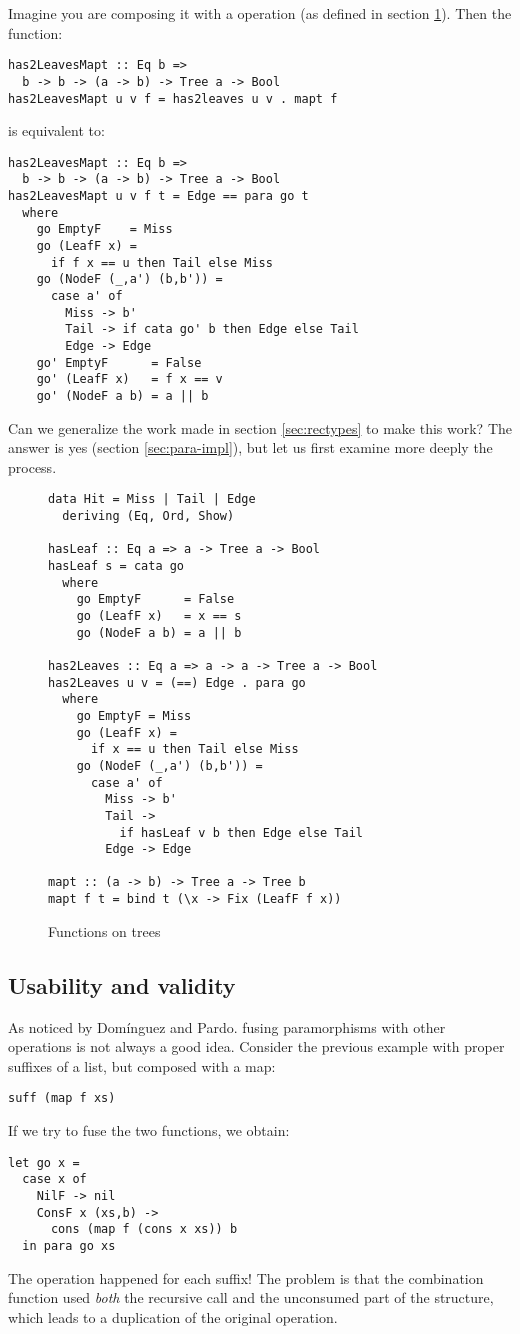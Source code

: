 Imagine you are composing it with a  operation (as defined in section \ref{fig:has2Leaves}). Then
the function:
\begin{verbatim}
has2LeavesMapt :: Eq b =>
  b -> b -> (a -> b) -> Tree a -> Bool
has2LeavesMapt u v f = has2leaves u v . mapt f
\end{verbatim}
\noindent is equivalent to:
\begin{verbatim}
has2LeavesMapt :: Eq b =>
  b -> b -> (a -> b) -> Tree a -> Bool
has2LeavesMapt u v f t = Edge == para go t
  where
    go EmptyF    = Miss
    go (LeafF x) =
      if f x == u then Tail else Miss
    go (NodeF (_,a') (b,b')) =
      case a' of
        Miss -> b'
        Tail -> if cata go' b then Edge else Tail
        Edge -> Edge
    go' EmptyF      = False
    go' (LeafF x)   = f x == v
    go' (NodeF a b) = a || b
\end{verbatim}

\noindent Can we generalize the work made in section \ref{sec:rectypes} to make this work? The answer is yes (section \ref{sec:para-impl}), but let us first examine more deeply the process.

\begin{figure}
\begin{verbatim}
data Hit = Miss | Tail | Edge
  deriving (Eq, Ord, Show)

hasLeaf :: Eq a => a -> Tree a -> Bool
hasLeaf s = cata go
  where
    go EmptyF      = False
    go (LeafF x)   = x == s
    go (NodeF a b) = a || b

has2Leaves :: Eq a => a -> a -> Tree a -> Bool
has2Leaves u v = (==) Edge . para go
  where
    go EmptyF = Miss
    go (LeafF x) =
      if x == u then Tail else Miss
    go (NodeF (_,a') (b,b')) =
      case a' of
        Miss -> b'
        Tail ->
          if hasLeaf v b then Edge else Tail
        Edge -> Edge

mapt :: (a -> b) -> Tree a -> Tree b
mapt f t = bind t (\x -> Fix (LeafF f x))
\end{verbatim}
\caption{Functions on trees}
\label{fig:has2Leaves}
\end{figure}

\subsection{Usability and validity}
As noticed by Domínguez and Pardo. \cite{paramorphismFusion} fusing paramorphisms with other operations is not always a good idea. Consider the previous example with proper suffixes of a list, but composed with a map:
\begin{verbatim}
suff (map f xs)
\end{verbatim}
\noindent If we try to fuse the two functions, we obtain:
\begin{verbatim}
let go x =
  case x of
    NilF -> nil
    ConsF x (xs,b) ->
      cons (map f (cons x xs)) b
  in para go xs
\end{verbatim}
\noindent The  operation happened for each suffix! The problem is that the combination function used \emph{both} the recursive call and the unconsumed part of the structure, which leads to a duplication of the original  operation.

